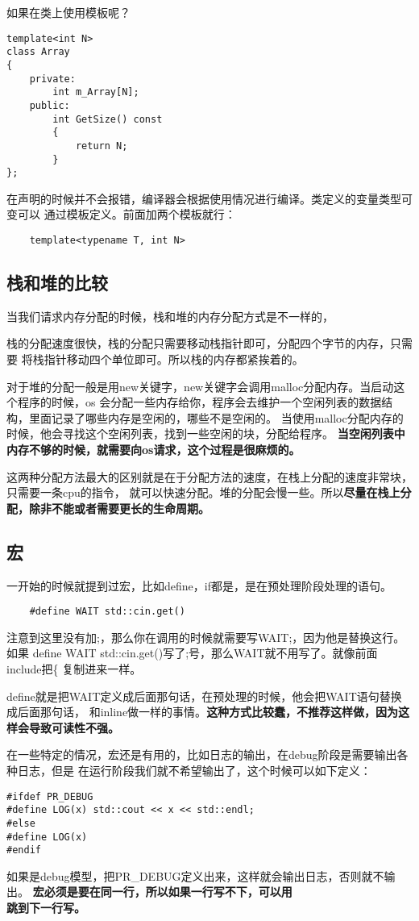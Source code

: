 \documentclass{article}
\begin{document}
\begin{sloppypar}
如果在类上使用模板呢？
\begin{lstlisting}
template<int N>
class Array
{
    private:
        int m_Array[N];
    public:
        int GetSize() const
        {
            return N;
        }
};
\end{lstlisting}
在声明的时候并不会报错，编译器会根据使用情况进行编译。类定义的变量类型可变可以
通过模板定义。前面加两个模板就行：
\begin{lstlisting}
	template<typename T, int N>
\end{lstlisting}

\subsection{栈和堆的比较}
当我们请求内存分配的时候，栈和堆的内存分配方式是不一样的，

栈的分配速度很快，栈的分配只需要移动栈指针即可，分配四个字节的内存，只需要
将栈指针移动四个单位即可。所以栈的内存都紧挨着的。

对于堆的分配一般是用new关键字，new关键字会调用malloc分配内存。当启动这个程序的时候，os
会分配一些内存给你，程序会去维护一个空闲列表的数据结构，里面记录了哪些内存是空闲的，哪些不是空闲的。
当使用malloc分配内存的时候，他会寻找这个空闲列表，找到一些空闲的块，分配给程序。\textbf{
	当空闲列表中内存不够的时候，就需要向os请求，这个过程是很麻烦的。
}

这两种分配方法最大的区别就是在于分配方法的速度，在栈上分配的速度非常块，只需要一条cpu的指令，
就可以快速分配。堆的分配会慢一些。所以\textbf{尽量在栈上分配，除非不能或者需要更长的生命周期。}

\subsection{宏}
一开始的时候就提到过宏，比如define，if都是，是在预处理阶段处理的语句。
\begin{lstlisting}
	#define WAIT std::cin.get()
\end{lstlisting}
注意到这里没有加;，那么你在调用的时候就需要写WAIT;，因为他是替换这行。如果
define WAIT std::cin.get()写了;号，那么WAIT就不用写了。就像前面include把\{
复制进来一样。

define就是把WAIT定义成后面那句话，在预处理的时候，他会把WAIT语句替换成后面那句话，
和inline做一样的事情。\textbf{这种方式比较蠢，不推荐这样做，因为这样会导致可读性不强。}

在一些特定的情况，宏还是有用的，比如日志的输出，在debug阶段是需要输出各种日志，但是
在运行阶段我们就不希望输出了，这个时候可以如下定义：
\begin{lstlisting}
#ifdef PR_DEBUG
#define LOG(x) std::cout << x << std::endl;
#else
#define LOG(x)
#endif
\end{lstlisting}
如果是debug模型，把PR\_DEBUG定义出来，这样就会输出日志，否则就不输出。
\textbf{宏必须是要在同一行，所以如果一行写不下，可以用\\跳到下一行写。}


\end{sloppypar}
\end{document}
